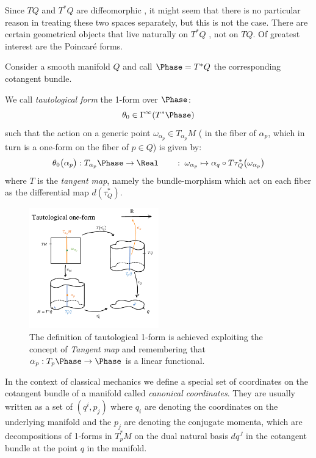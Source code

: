 \documentclass[Main]{subfiles}
\begin{document}
					Since $TQ$ and $T^*Q$ are diffeomorphic , it might seem that there is no particular reason in treating these two spaces separately, but this is not the case.
					There are certain geometrical objects that live naturally on $T^*Q$ , not on $TQ$.
					Of greatest interest %
					are the Poincaré forms\cite{Frankel2003}.
	
					Consider a smooth manifold $Q$ and call $\Phase=T^*Q$ the corresponding cotangent bundle.
					\begin{definition}
						We call \emph{tautological form} the 1-form over $\Phase$:
						\begin{displaymath}
							\theta_0 \in \Gamma^\infty (T^*\Phase)
						\end{displaymath}
					such that the action on a generic point $ \omega_{\alpha_p} \in T_{\alpha_p}M$ ( in the fiber of $\alpha_p$, which in turn is a one-form on the fiber of $p\in Q$) is given by:
						\begin{displaymath}
						\theta_0 \big(\alpha_p \big): T_{\alpha_p}\Phase \rightarrow \Real \qquad : \; \omega_{\alpha_p} \mapsto \alpha_q \circ T \tau^*_Q \big( \omega_{\alpha_p} \big)
						\end{displaymath}
					where $T$ is the \emph{tangent map}, namely the bundle-morphism which act on each fiber as the differential map $d (\tau^*_Q)$.
					\end{definition}
					\begin{figure}[h!]
						\centering
   						\includegraphics[width=0.5\textwidth]{Pictures/Tautological1Form} 
 						\caption{The definition of tautological 1-form is achieved exploiting the concept of \emph{Tangent map} and remembering that $\alpha_p: T_p \Phase \rightarrow \Phase$ is a linear functional.} 
  						\centering
					\end{figure}	
						In the context of classical mechanics we define a  special set of coordinates on the cotangent bundle of a manifold called \emph{canonical coordinates}.
						They are usually written as a set of $(q^i,p_j)$ where ${q_i}$ are denoting the coordinates on the underlying manifold and the ${p_j}$ are denoting the conjugate momenta, which are decompositions of 1-forms in $T_p^*M$ on the dual natural basis $d q^J$ in the cotangent bundle at the point $q$ in the manifold.
	
\end{document}
